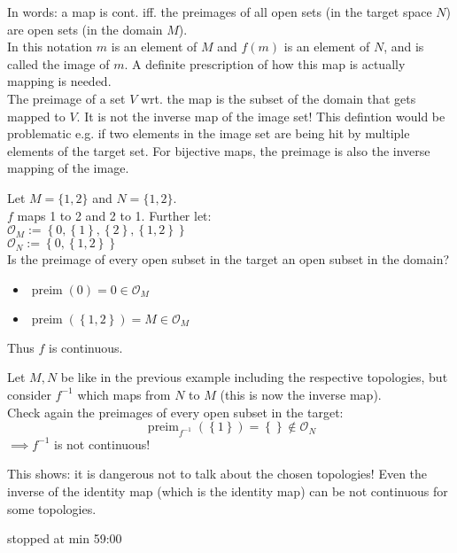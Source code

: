 In words: a map is cont. iff. the preimages of all open sets (in the target space $N$) are open sets (in the domain $M$).\\

In this notation $m$ is an element of $M$ and $f(m)$ is an element of $N$, and is called the image of $m$. A definite prescription of how this map is actually mapping is needed.\\
The preimage of a set $V$ wrt. the map is the subset of the domain that gets mapped to $V$. It is not the inverse map of the image set! This defintion would be problematic e.g. if two elements in the image set are being hit by multiple elements of the target set. For bijective maps, the preimage is also the inverse mapping of the image.

\begin{example}
    Let $M=\{1,2\}$ and $N=\{1,2\}$.\\
    $f$ maps 1 to 2 and 2 to 1. Further let:\\
    $\mathcal{O}_M := \left \{ 0, \left \{ 1 \right \}, \left \{ 2 \right \} , \left \{ 1,2 \right \} \right \}$ \\
    $\mathcal{O}_N := \left \{ 0, \left \{ 1,2 \right \} \right \}$ \\
    Is the preimage of every open subset in the target an open subset in the domain?
    \begin{itemize}[itemsep=3pt, topsep=3pt]
        \item $\operatorname{preim} (0) = 0 \in \mathcal{O}_M$
        \item $\operatorname{preim} \left ( \left \{ 1,2 \right \} \right ) = M \in \mathcal{O}_M$
    \end{itemize}
    Thus $f$ is continuous.
\end{example}

\begin{example}
    Let $M,N$ be like in the previous example including the respective topologies, but consider $f^{-1}$ which maps from $N$ to $M$ (this is now the inverse map).\\
    Check again the preimages of every open subset in the target:
    $$\operatorname{preim}_{f^{-1}} \left ( \left \{ 1 \right \} \right ) = \left \{  \right \} \notin \mathcal{O}_N$$
    $\implies f^{-1}$ is not continuous!
\end{example}

This shows: it is dangerous not to talk about the chosen topologies! Even the inverse of the identity map (which is the identity map) can be not continuous for some topologies.

stopped at min 59:00